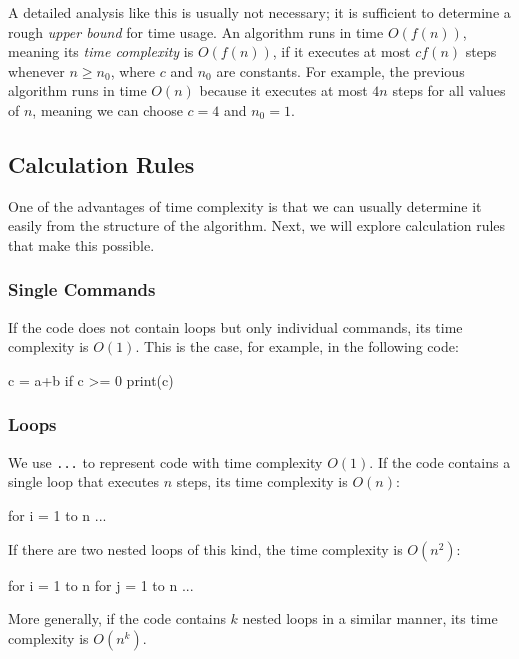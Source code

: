 A detailed analysis like this is usually not necessary;
it is sufficient to determine a rough \emph{upper bound} for time usage.
An algorithm runs in time $O(f(n))$, meaning its
\emph{time complexity} is $O(f(n))$, if it executes at most
$c f(n)$ steps whenever $n \ge n_0$, where $c$ and $n_0$ are constants.
For example, the previous algorithm runs in time $O(n)$
because it executes at most $4n$ steps for all values of $n$,
meaning we can choose $c=4$ and $n_0=1$.

\subsection{Calculation Rules}

One of the advantages of time complexity is that we can usually
determine it easily from the structure of the algorithm.
Next, we will explore calculation rules that make this possible.

\subsubsection{Single Commands}

If the code does not contain loops but only
individual commands, its time complexity is $O(1)$.
This is the case, for example, in the following code:

\begin{code}
    c = a+b
    if c >= 0
    print(c)
\end{code}

\subsubsection{Loops}

We use \texttt{...} to represent code
with time complexity $O(1)$.
If the code contains a single loop
that executes $n$ steps,
its time complexity is $O(n)$:

\begin{code}
    for i = 1 to n
    ...
\end{code}

If there are two nested loops of this kind,
the time complexity is $O(n^2)$:

\begin{code}
    for i = 1 to n
    for j = 1 to n
    ...
\end{code}

More generally, if the code contains
$k$ nested loops in a similar manner, its time complexity is $O(n^k)$.

